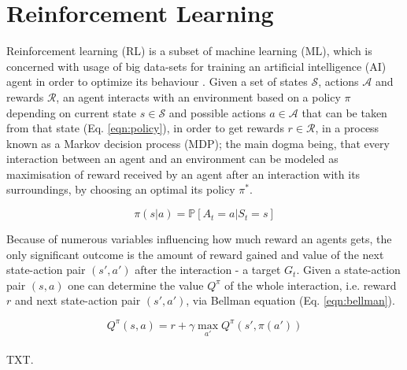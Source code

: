 \documentclass{article}
\begin{document}
\section{Reinforcement Learning}
Reinforcement learning (RL) is a subset of machine learning (ML), which is concerned with usage of big data-sets for training an artificial intelligence  (AI) agent in order to optimize its behaviour \cite{lapan2018deep}. Given a set of states $\mathcal{S}$, actions $\mathcal{A}$ and rewards $\mathcal{R}$, an agent interacts with an environment based on a policy $\pi$ depending on current state $s\in\mathcal{S}$ and possible actions $a\in\mathcal{A}$ that can be taken from that state (Eq. \ref{eqn:policy}), in order to get rewards $r\in\mathcal{R}$, in a process known as a Markov decision process (MDP); the main dogma being, that every interaction between an agent and an environment can be modeled as maximisation of reward received by an agent after an interaction with its surroundings, by choosing an optimal its policy $\pi^{*}$.

\begin{equation}
    \label{eqn:policy}
    \pi(s|a)=\mathbb{P}[A_t=a|S_t=s]
\end{equation}

Because of numerous variables influencing how much reward an agents gets, the only significant outcome is the amount of reward gained and value of the next state-action pair $(s',a')$ after the interaction - a target $G_t$. Given a state-action pair $(s,a)$ one can determine the value $Q^\pi$ of the whole interaction, i.e. reward $r$ and next state-action pair $(s',a')$, via Bellman equation (Eq. \ref{eqn:bellman}).

\begin{equation}
\label{eqn:bellman}
Q^\pi(s,a) = r+\gamma \max_{a'}Q^\pi(s',\pi(a'))
\end{equation}
\\
TXT.

\newpage
\end{document}
